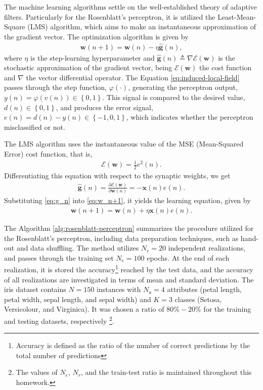 \documentclass[12pt,a4paper]{article}
\begin{document}
The machine learning algorithms settle on the well-established theory of adaptive filters. Particularly for the Rosenblatt's perceptron, it is utilized the Least-Mean-Square (LMS) algorithm, which aims to make an instantaneous approximation of the gradient vector. The optimization algorithm is given by
\begin{align}
    \mathbf{w}(n+1) = \mathbf{w}(n) - \eta \hat{\mathbf{g}}(n),
    \label{eq:w_n+1}
\end{align}
where \(\eta\) is the step-learning hyperparameter and \(\hat{\mathbf{g}}(n) \triangleq \nabla \mathscr{E} (\mathbf{w})\) is the stochastic approximation of the gradient vector, being \(\mathscr{E} (\mathbf{w})\) the cost function and \(\nabla\) the vector differential operator. The Equation \eqref{eq:induced-local-field} passes through the step function, \(\varphi \left( \cdot \right)\), generating the perceptron output, \(y\left( n \right) = \varphi(v\left( n \right)) \in \left\{ 0,1 \right\}\). This signal is compared to the desired value, \(d\left( n \right) \in \left\{ 0,1 \right\} \), and produces the error signal, \(e\left( n \right) = d\left( n \right) - y\left( n \right) \in \left\{ -1, 0, 1 \right\}\), which indicates whether the perceptron misclassified or not.

The LMS algorithm uses the instantaneous value of the MSE (Mean-Squared Error) cost function, that is,
\begin{align}
    \mathscr{E} (\mathbf{w}) = \frac{1}{2}e^2(n).
\end{align}
Differentiating this equation with respect to the synaptic weights, we get
\begin{align}
    \hat{\mathbf{g}}(n) = \frac{\partial\mathscr{E} (\mathbf{w})}{\partial \mathbf{w}(n)} = - \mathbf{x}(n) e(n).
    \label{eq:g_n}
\end{align}
Substituting \eqref{eq:g_n} into \eqref{eq:w_n+1}, it yields the learning equation, given by
\begin{align}
    \mathbf{w}(n+1) = \mathbf{w}(n) + \eta \mathbf{x}(n) e(n).
    \label{eq:g_n}
\end{align}

The Algorithm \ref{alg:rosenblatt-perceptron} summarizes the procedure utilized for the Rosenblatt's perceptron, including data preparation techniques, such as hand-out and data shuffling. The method utilizes \(N_r=20\) independent realizations, and passes through the training set \(N_e=100\) epochs. At the end of each realization, it is stored the accuracy\footnote{Accuracy is defined as the ratio of the number of correct predictions by the total number of predictions} reached by the test data, and the accuracy of all realizations are investigated in terms of mean and standard deviation. The iris dataset contains \(N=150\) instances with \(N_a=4\) attributes (petal length, petal width, sepal length, and sepal width) and \(K=3\) classes (Setosa, Versicolour, and Virginica). It was chosen a ratio of \(80\%-20\%\) for the training and testing datasets, respectively \footnote{The values of \(N_e\), \(N_r\), and the train-test ratio is maintained throughout this homework.}.
\end{document}
